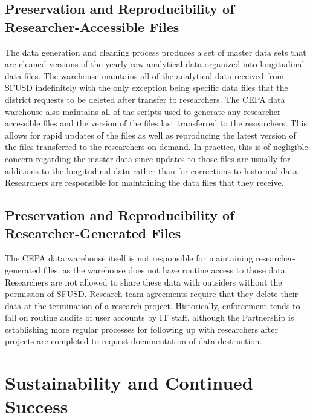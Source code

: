 \hypertarget{preservation-and-reproducibility-of-researcher-accessible-files-3}{%
\subsection{Preservation and Reproducibility of Researcher-Accessible Files}\label{preservation-and-reproducibility-of-researcher-accessible-files-3}}

The data generation and cleaning process produces a set of master data sets that are cleaned versions of the yearly raw analytical data organized into longitudinal data files. The warehouse maintains all of the analytical data received from SFUSD indefinitely with the only exception being specific data files that the district requests to be deleted after transfer to researchers. The CEPA data warehouse also maintains all of the scripts used to generate any researcher-accessible files and the version of the files last transferred to the researchers. This allows for rapid updates of the files as well as reproducing the latest version of the files transferred to the researchers on demand. In practice, this is of negligible concern regarding the master data since updates to those files are usually for additions to the longitudinal data rather than for corrections to historical data. Researchers are responsible for maintaining the data files that they receive.

\hypertarget{preservation-and-reproducibility-of-researcher-generated-files-2}{%
\subsection{Preservation and Reproducibility of Researcher-Generated Files}\label{preservation-and-reproducibility-of-researcher-generated-files-2}}

The CEPA data warehouse itself is not responsible for maintaining researcher-generated files, as the warehouse does not have routine access to those data. Researchers are not allowed to share these data with outsiders without the permission of SFUSD. Research team agreements require that they delete their data at the termination of a research project. Historically, enforcement tends to fall on routine audits of user accounts by IT staff, although the Partnership is establishing more regular processes for following up with researchers after projects are completed to request documentation of data destruction.

\hypertarget{sustainability-and-continued-success-4}{%
\section{Sustainability and Continued Success}\label{sustainability-and-continued-success-4}}


